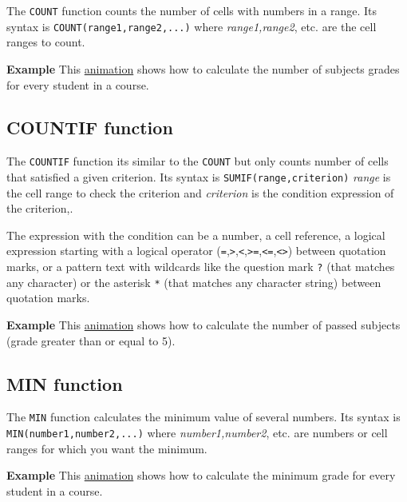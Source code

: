 The \texttt{COUNT} function counts the number of cells with numbers in a range.  Its syntax is \texttt{COUNT(range1,range2,...)} where \emph{range1,range2}, etc. are the cell ranges to count.

\textbf{Example} This \href{http://aprendeconalf.es/office/excel/manual/img/example_function_count.gif}{animation} shows how to calculate the number of subjects grades for every student in a course.

\subsection{COUNTIF function}\hypertarget{countif-function}{}\label{countif-function}

The \texttt{COUNTIF} function its similar to the \texttt{COUNT} but only counts number of cells that satisfied a given criterion. Its syntax is \texttt{SUMIF(range,criterion)} \emph{range} is the cell range to check the criterion and \emph{criterion} is the condition expression of the criterion,.

The expression with the condition can be a number, a cell reference, a logical expression starting with a logical operator (\texttt{=},\texttt{\textgreater{}},\texttt{\textless{}},\texttt{\textgreater{}=},\texttt{\textless{}=},\texttt{\textless{}\textgreater{}}) between quotation marks, or a pattern text with wildcards like the question mark \texttt{?} (that matches any character) or the asterisk \texttt{*} (that matches any character string) between quotation marks.

\textbf{Example} This \href{http://aprendeconalf.es/office/excel/manual/img/example_function_countif.gif}{animation} shows how to calculate the number of passed subjects (grade greater than or equal to 5).

\subsection{MIN function}\hypertarget{min-function}{}\label{min-function}

The \texttt{MIN} function calculates the minimum value of several numbers. Its syntax is \texttt{MIN(number1,number2,...)} where \emph{number1,number2}, etc. are numbers or cell ranges for which you want the minimum.

\textbf{Example} This \href{http://aprendeconalf.es/office/excel/manual/img/example_function_min.gif}{animation} shows how to calculate the minimum grade for every student in a course.

